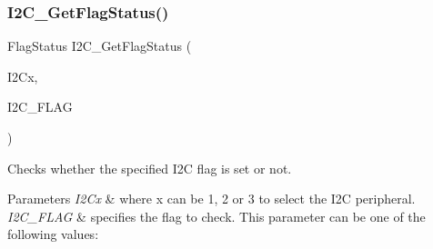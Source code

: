 \subsubsection{\texorpdfstring{I2\+C\+\_\+\+Get\+Flag\+Status()}{I2C\_GetFlagStatus()}}
{\footnotesize\ttfamily Flag\+Status I2\+C\+\_\+\+Get\+Flag\+Status (\begin{DoxyParamCaption}\item[{I2\+C\+\_\+\+Type\+Def $\ast$}]{I2\+Cx,  }\item[{uint32\+\_\+t}]{I2\+C\+\_\+\+F\+L\+AG }\end{DoxyParamCaption})}



Checks whether the specified I2C flag is set or not. 


\begin{DoxyParams}{Parameters}
{\em I2\+Cx} & where x can be 1, 2 or 3 to select the I2C peripheral. \\
\hline
{\em I2\+C\+\_\+\+F\+L\+AG} & specifies the flag to check. This parameter can be one of the following values\+: \begin{DoxyItemize}

\end{DoxyItemize}
\end{DoxyParams}
